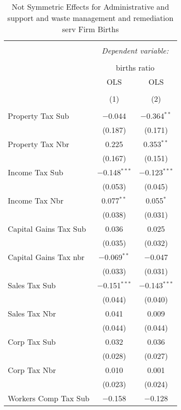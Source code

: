 
\begin{table}[!htbp] \centering 
  \caption{Not Symmetric Effects for  Administrative and support and waste management and remediation serv Firm Births} 
  \label{56noequality} 
\footnotesize 
\begin{tabular}{@{\extracolsep{5pt}}lcc} 
\\[-1.8ex]\hline 
\hline \\[-1.8ex] 
 & \multicolumn{2}{c}{\textit{Dependent variable:}} \\ 
\cline{2-3} 
\\[-1.8ex] & \multicolumn{2}{c}{births ratio} \\ 
 & OLS & OLS \\ 
\\[-1.8ex] & (1) & (2)\\ 
\hline \\[-1.8ex] 
 Property Tax Sub & $-$0.044 & $-$0.364$^{**}$ \\ 
  & (0.187) & (0.171) \\ 
  Property Tax Nbr & 0.225 & 0.353$^{**}$ \\ 
  & (0.167) & (0.151) \\ 
  Income Tax Sub & $-$0.148$^{***}$ & $-$0.123$^{***}$ \\ 
  & (0.053) & (0.045) \\ 
  Income Tax Nbr & 0.077$^{**}$ & 0.055$^{*}$ \\ 
  & (0.038) & (0.031) \\ 
  Capital Gains Tax Sub & 0.036 & 0.025 \\ 
  & (0.035) & (0.032) \\ 
  Capital Gains Tax nbr & $-$0.069$^{**}$ & $-$0.047 \\ 
  & (0.033) & (0.031) \\ 
  Sales Tax Sub & $-$0.151$^{***}$ & $-$0.143$^{***}$ \\ 
  & (0.044) & (0.040) \\ 
  Sales Tax Nbr & 0.041 & 0.009 \\ 
  & (0.044) & (0.044) \\ 
  Corp Tax Sub & 0.032 & 0.036 \\ 
  & (0.028) & (0.027) \\ 
  Corp Tax Nbr & 0.010 & 0.001 \\ 
  & (0.023) & (0.024) \\ 
  Workers Comp Tax Sub & $-$0.158 & $-$0.128 \\ 

\end{tabular}
\end{table}
